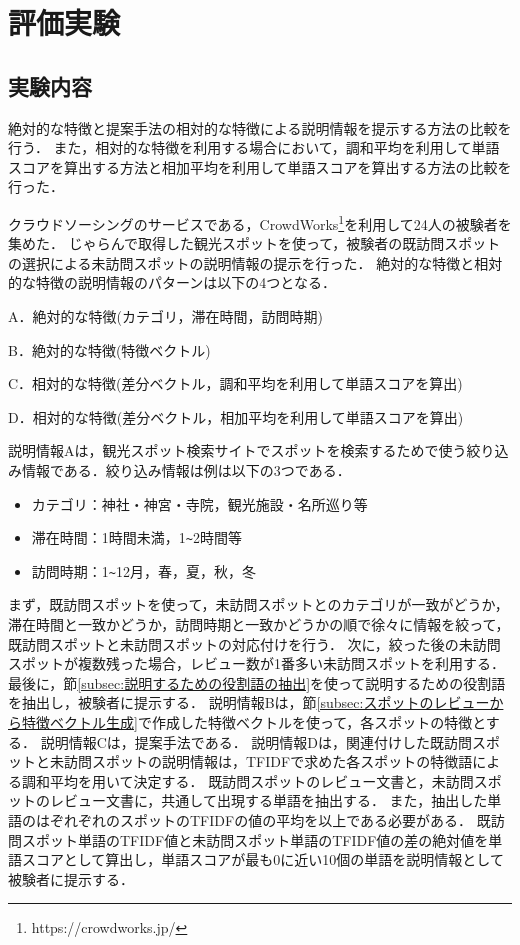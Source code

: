 \documentclass{deimj}
\begin{document}
\section{評価実験}
\label{sec:評価実験}

\subsection{実験内容}

絶対的な特徴と提案手法の相対的な特徴による説明情報を提示する方法の比較を行う．
また，相対的な特徴を利用する場合において，調和平均を利用して単語スコアを算出する方法と相加平均を利用して単語スコアを算出する方法の比較を行った．

クラウドソーシングのサービスである，CrowdWorks\footnote{https://crowdworks.jp/}を利用して24人の被験者を集めた．
じゃらんで取得した観光スポットを使って，被験者の既訪問スポットの選択による未訪問スポットの説明情報の提示を行った．
絶対的な特徴と相対的な特徴の説明情報のパターンは以下の4つとなる．
\begin{description}
  \item A．絶対的な特徴(カテゴリ，滞在時間，訪問時期)
  \item B．絶対的な特徴(特徴ベクトル)
  \item C．相対的な特徴(差分ベクトル，調和平均を利用して単語スコアを算出)
  \item D．相対的な特徴(差分ベクトル，相加平均を利用して単語スコアを算出)
\end{description}

説明情報Aは，観光スポット検索サイトでスポットを検索するためで使う絞り込み情報である．絞り込み情報は例は以下の3つである．
\begin{itemize}
 \item カテゴリ：神社・神宮・寺院，観光施設・名所巡り等
 \item 滞在時間：1時間未満，1\verb|~|2時間等
 \item 訪問時期：1\verb|~|12月，春，夏，秋，冬
\end{itemize}
まず，既訪問スポットを使って，未訪問スポットとのカテゴリが一致がどうか，滞在時間と一致かどうか，訪問時期と一致かどうかの順で徐々に情報を絞って，既訪問スポットと未訪問スポットの対応付けを行う．
次に，絞った後の未訪問スポットが複数残った場合，レビュー数が1番多い未訪問スポットを利用する．
最後に，節\ref{subsec:説明するための役割語の抽出}を使って説明するための役割語を抽出し，被験者に提示する．
説明情報Bは，節\ref{subsec:スポットのレビューから特徴ベクトル生成}で作成した特徴ベクトルを使って，各スポットの特徴とする．
説明情報Cは，提案手法である．
説明情報Dは，関連付けした既訪問スポットと未訪問スポットの説明情報は，TFIDFで求めた各スポットの特徴語による調和平均を用いて決定する．
既訪問スポットのレビュー文書と，未訪問スポットのレビュー文書に，共通して出現する単語を抽出する．
また，抽出した単語のはぞれぞれのスポットのTFIDFの値の平均を以上である必要がある．
既訪問スポット単語のTFIDF値と未訪問スポット単語のTFIDF値の差の絶対値を単語スコアとして算出し，単語スコアが最も0に近い10個の単語を説明情報として被験者に提示する．
\end{document}
